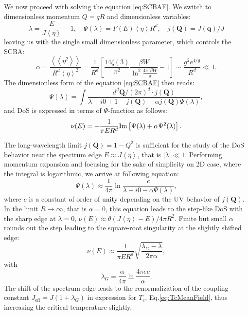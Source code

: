 \documentclass[twocolumn,english,prb]{revtex4-1}
\begin{document}
We now proceed with solving the equation \eqref{eq:SCBAF}. We switch to dimensionless momentum $Q = q R$ and dimensionless variables:
\begin{equation}
\lambda=\frac{E}{J\left\langle \eta\right\rangle }-1,\quad \Psi(\lambda) = F(E) \left\langle \eta\right\rangle R^{d},\quad j(\boldsymbol{Q}) = J(\boldsymbol{q})/J
\end{equation}
leaving us with the single small dimensionless parameter, which controls the SCBA:
\begin{equation}
\alpha=\frac{\left\langle\left\langle \eta^{2}\right\rangle\right\rangle }{R^{d}\left\langle \eta\right\rangle ^{2}}=\frac{1}{R^{d}}\left[\frac{14\zeta(3)}{\pi^{2}}\frac{\beta W}{\ln^{2}\frac{4e^{\gamma}\beta W}{\pi}}-1\right]\sim\frac{g^{2}e^{1/g}}{R^{d}} \ll 1.
\end{equation}
The dimensionless form of the equation \eqref{eq:SCBAF} then reads:
\begin{equation}
\label{eq:PsiExact}
\Psi(\lambda)=\int\frac{d^d\boldsymbol{Q}/ (2\pi)^d \cdot j(\boldsymbol{Q})}{\lambda+i0+1-j(\boldsymbol{Q})-\alpha j(\boldsymbol{Q})\Psi(\lambda)},
\end{equation}
and DoS is expressed in terms of $\Psi$-function as follows:
\begin{equation}
\label{eq:DOSSCBA}
\nu(E)=-\frac{1}{\pi ER^{d}}{\rm Im}\left[\Psi(\lambda)+\alpha\Psi^{2}(\lambda)\right].
\end{equation}

The long-wavelength limit $j(\boldsymbol{Q}) = 1 - Q^2$  is sufficient for the study of the DoS behavior near the spectrum edge
$E \approx J \left\langle \eta\right\rangle$, that is $|\lambda| \ll 1$. Performing momentum expansion and focusing for the sake of simplicity on 2D case, where the integral is logarithmic, we arrive at following equation:
\begin{equation}
\Psi(\lambda)\approx\frac{1}{4\pi}\ln\frac{c}{\lambda + i0-\alpha\Psi(\lambda)},
\end{equation}
where $c$ is a constant of order of unity depending on the UV behavior of $j(\boldsymbol{Q})$. In the limit $R \to \infty$, that is $\alpha = 0$, this equation leads to the step-like DoS with the sharp edge at $\lambda = 0$, 
$\nu(E)\approx\theta(J\left\langle \eta\right\rangle -E) / 4\pi R^2$. Finite but small $\alpha$ rounds out the step 
leading to the square-root singularity at the slightly shifted edge:
\begin{equation}
\label{eq:DOSSCBAedge}
\nu(E)\approx\frac{1}{\pi ER^{d}}\sqrt{\frac{\lambda_{G}-\lambda}{2\pi\alpha}},
\end{equation}
with 
\begin{equation}
\label{eq:TcRenormalization}
\lambda_{G}=\frac{\alpha}{4\pi}\ln\frac{4\pi ec}{\alpha}.
\end{equation}
The shift of the spectrum edge leads to the renormalization of the coupling constant $J_\textrm{eff} = J(1+\lambda_G)$ in expression for $T_c$, Eq.\eqref{eq:TcMeanField}, thus  increasing the critical temperature slightly.
\end{document}
